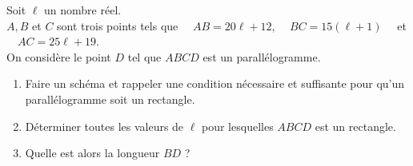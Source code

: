 \documentclass[a4paper,11pt,exos]{nsi} %
\begin{document}
Soit $\ell$ un nombre réel.\\
$A, B$ et $C$ sont trois points tels que $\quad AB=20\ell +12$, $\quad BC=15(\ell+1)\quad$ et $\quad AC=25\ell +19$.\\
On considère le point $D$ tel que $ABCD$ est un parallélogramme.
\begin{enumerate}
	\item 	Faire un schéma et rappeler une condition nécessaire et suffisante pour qu'un parallélogramme soit un rectangle.
	\item 	Déterminer toutes les valeurs de $\ell$ pour lesquelles $ABCD$ est un rectangle.
	\item	 Quelle est alors la longueur $BD$ ?\\
\end{enumerate}
\end{document}
